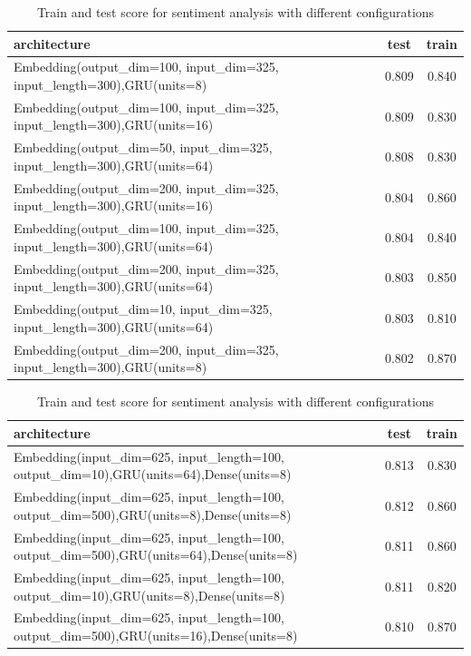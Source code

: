 \documentclass[10pt]{SelfArx} %
\begin{document}
	\begin{table}[]
		\begin{tabular*}{1\linewidth}{@{\extracolsep{\fill} }lcc@{}}
			\toprule
			architecture & test & train \\ \midrule
			Embedding(output\_dim=100, input\_dim=325, input\_length=300),GRU(units=8) & 0.809 & 0.840 \\
			Embedding(output\_dim=100, input\_dim=325, input\_length=300),GRU(units=16) & 0.809 & 0.830 \\
			Embedding(output\_dim=50, input\_dim=325, input\_length=300),GRU(units=64) & 0.808 & 0.830 \\
			Embedding(output\_dim=200, input\_dim=325, input\_length=300),GRU(units=16) & 0.804 & 0.860 \\
			Embedding(output\_dim=100, input\_dim=325, input\_length=300),GRU(units=64) & 0.804 & 0.840 \\
			Embedding(output\_dim=200, input\_dim=325, input\_length=300),GRU(units=64) & 0.803 & 0.850 \\
			Embedding(output\_dim=10, input\_dim=325, input\_length=300),GRU(units=64) & 0.803 & 0.810 \\
			Embedding(output\_dim=200, input\_dim=325, input\_length=300),GRU(units=8) & 0.802 & 0.870 \\ \bottomrule
		\end{tabular*}
		\caption{Train and test score for sentiment analysis with different configurations}
		\label{tsentiment6}
	\end{table}
	\begin{table}[]
		\begin{tabular*}{1\linewidth}{@{\extracolsep{\fill} }lcc@{}}
			\toprule
			architecture & test & train \\ \midrule
			Embedding(input\_dim=625, input\_length=100, output\_dim=10),GRU(units=64),Dense(units=8) & 0.813 & 0.830 \\
			Embedding(input\_dim=625, input\_length=100, output\_dim=500),GRU(units=8),Dense(units=8) & 0.812 & 0.860 \\
			Embedding(input\_dim=625, input\_length=100, output\_dim=500),GRU(units=64),Dense(units=8) & 0.811 & 0.860 \\
			Embedding(input\_dim=625, input\_length=100, output\_dim=10),GRU(units=8),Dense(units=8) & 0.811 & 0.820 \\
			Embedding(input\_dim=625, input\_length=100, output\_dim=500),GRU(units=16),Dense(units=8) & 0.810 & 0.870 \\ \bottomrule
		\end{tabular*}
		\caption{Train and test score for sentiment analysis with different configurations}
		\label{tsentiment5}
	\end{table}
\end{document}
